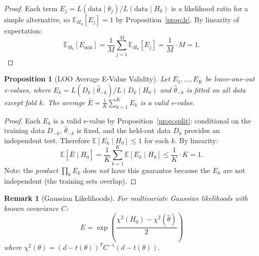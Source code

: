 \documentclass[11pt,a4paper]{article}
\newtheorem{proposition}{Proposition}
\newtheorem{remark}{Remark}
\newcommand{\E}{\mathbb{E}}
\begin{document}
\begin{proof}
Each term $E_j = L(\text{data} \mid \theta_j) / L(\text{data} \mid H_0)$ is a likelihood ratio for a simple alternative, so $\E_{H_0}[E_j] = 1$ by Proposition~\ref{prop:lr}. By linearity of expectation:
\begin{equation}
\E_{H_0}[E_{\text{mix}}] = \frac{1}{M} \sum_{j=1}^M \E_{H_0}[E_j] = \frac{1}{M} \cdot M = 1.
\end{equation}
\end{proof}

\begin{proposition}[LOO Average E-Value Validity]
\label{prop:loo}
Let $E_1, \ldots, E_K$ be leave-one-out e-values, where $E_k = L(D_k \mid \hat{\theta}_{-k}) / L(D_k \mid H_0)$ and $\hat{\theta}_{-k}$ is fitted on all data except fold $k$. The average $\bar{E} = \frac{1}{K}\sum_{k=1}^K E_k$ is a valid e-value.
\end{proposition}

\begin{proof}
Each $E_k$ is a valid e-value by Proposition~\ref{prop:split}: conditional on the training data $D_{-k}$, $\hat{\theta}_{-k}$ is fixed, and the held-out data $D_k$ provides an independent test. Therefore $\E[E_k \mid H_0] \leq 1$ for each $k$. By linearity:
\begin{equation}
\E[\bar{E} \mid H_0] = \frac{1}{K}\sum_{k=1}^K \E[E_k \mid H_0] \leq \frac{1}{K} \cdot K = 1.
\end{equation}
Note: the \textit{product} $\prod_k E_k$ does \textit{not} have this guarantee because the $E_k$ are not independent (the training sets overlap).
\end{proof}

\begin{remark}[Gaussian Likelihoods]
For multivariate Gaussian likelihoods with known covariance $C$:
\begin{equation}
E = \exp\left(\frac{\chi^2(H_0) - \chi^2(\hat{\theta})}{2}\right)
\end{equation}
where $\chi^2(\theta) = (d - t(\theta))^T C^{-1} (d - t(\theta))$.
\end{remark}
\end{document}
